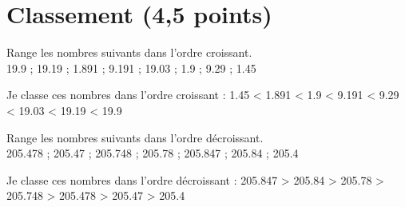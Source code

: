 \section{Classement (4,5 points)}

\begin{questions}
	\question[1\half] Range les nombres suivants dans l'ordre croissant. \\
	\num{19.9} \hspace{0.2cm} ; \hspace{0.2cm} \num{19.19} ; \num{1.891} \hspace{0.2cm} ; \hspace{0.2cm} \num{9.191} \hspace{0.2cm} ; \hspace{0.2cm} \num{19.03} \hspace{0.2cm} ; \hspace{0.2cm} \num{1.9} \hspace{0.2cm} ; \hspace{0.2cm} \num{9.29} \hspace{0.2cm} ; \hspace{0.2cm} \num{1.45}
	\begin{solution}
		Je classe ces nombres dans l'ordre croissant :
		\num{1.45} < \num{1.891} < \num{1.9} < \num{9.191} < \num{9.29} < \num{19.03} < \num{19.19} < \num{19.9}
	\end{solution}
	
	\question[1\half] Range les nombres suivants dans l'ordre décroissant. \\
	\num{205.478} \hspace{0.2cm} ; \hspace{0.2cm} \num{205.47} \hspace{0.2cm} ; \hspace{0.2cm} \num{205.748} \hspace{0.2cm} ; \hspace{0.2cm} \num{205.78} \hspace{0.2cm} ; \hspace{0.2cm} \num{205.847} \hspace{0.2cm} ; \hspace{0.2cm} \num{205.84} \hspace{0.2cm} ; \hspace{0.2cm} \num{205.4}
	\begin{solution}
		Je classe ces nombres dans l'ordre décroissant :
		\num{205.847} > \num{205.84} > \num{205.78} > \num{205.748} > \num{205.478} > \num{205.47} > \num{205.4} 
	\end{solution}
	

\end{questions}
